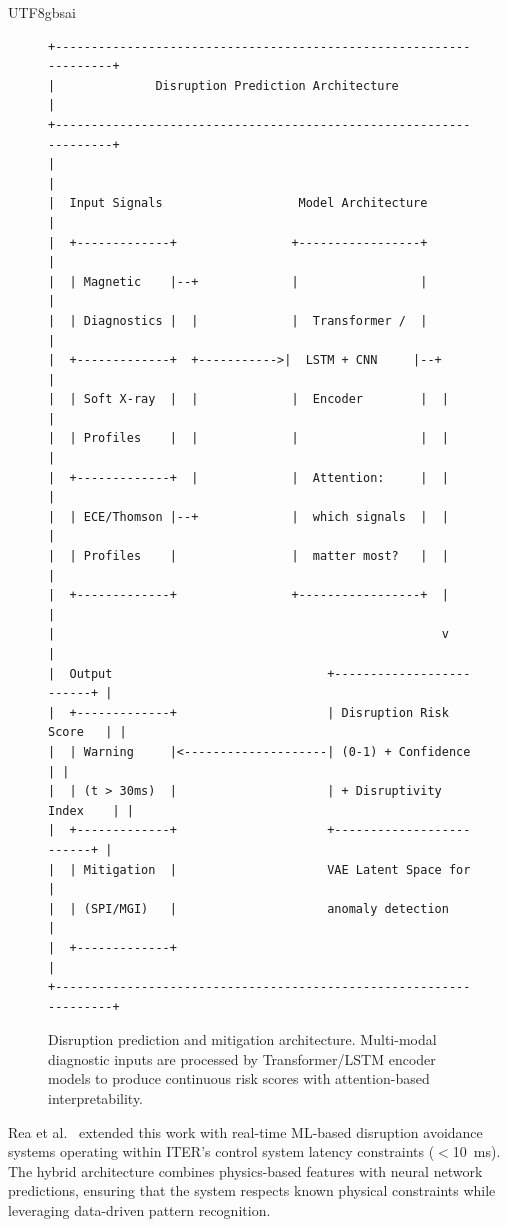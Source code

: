 \documentclass[12pt,a4paper]{article}
\begin{document}
\begin{CJK}{UTF8}{gbsai}
\begin{figure}[htbp]
\centering
\small
\begin{verbatim}
+-------------------------------------------------------------------+
|              Disruption Prediction Architecture                    |
+-------------------------------------------------------------------+
|                                                                   |
|  Input Signals                   Model Architecture               |
|  +-------------+                +-----------------+              |
|  | Magnetic    |--+             |                 |              |
|  | Diagnostics |  |             |  Transformer /  |              |
|  +-------------+  +----------->|  LSTM + CNN     |--+           |
|  | Soft X-ray  |  |             |  Encoder        |  |           |
|  | Profiles    |  |             |                 |  |           |
|  +-------------+  |             |  Attention:     |  |           |
|  | ECE/Thomson |--+             |  which signals  |  |           |
|  | Profiles    |                |  matter most?   |  |           |
|  +-------------+                +-----------------+  |           |
|                                                      v           |
|  Output                              +-------------------------+ |
|  +-------------+                     | Disruption Risk Score   | |
|  | Warning     |<--------------------| (0-1) + Confidence      | |
|  | (t > 30ms)  |                     | + Disruptivity Index    | |
|  +-------------+                     +-------------------------+ |
|  | Mitigation  |                     VAE Latent Space for        |
|  | (SPI/MGI)   |                     anomaly detection           |
|  +-------------+                                                 |
+-------------------------------------------------------------------+
\end{verbatim}
\caption{Disruption prediction and mitigation architecture. Multi-modal diagnostic inputs are processed by Transformer/LSTM encoder models to produce continuous risk scores with attention-based interpretability.}
\label{fig:disruption-arch}
\end{figure}

Rea et al.~\citep{Rea2018} extended this work with real-time ML-based disruption avoidance systems operating within ITER's control system latency constraints ($<$10~ms). The hybrid architecture combines physics-based features with neural network predictions, ensuring that the system respects known physical constraints while leveraging data-driven pattern recognition.


\end{CJK}
\end{document}
